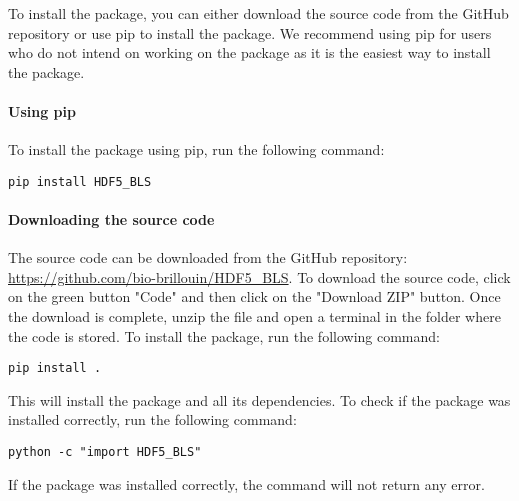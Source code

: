 To install the package, you can either download the source code from the GitHub repository or use pip to install the package. We recommend using pip for users who do not intend on working on the package as it is the easiest way to install the package.

\paragraph*{Using pip}
    To install the package using pip, run the following command:
\begin{lstlisting}
pip install HDF5_BLS
\end{lstlisting}   

\paragraph*{Downloading the source code}
The source code can be downloaded from the GitHub repository: \url{https://github.com/bio-brillouin/HDF5_BLS}. To download the source code, click on the green button "Code" and then click on the "Download ZIP" button. Once the download is complete, unzip the file and open a terminal in the folder where the code is stored. To install the package, run the following command:
\begin{lstlisting}
pip install .
\end{lstlisting}

This will install the package and all its dependencies. To check if the package was installed correctly, run the following command:
\begin{lstlisting}
python -c "import HDF5_BLS"
\end{lstlisting}

If the package was installed correctly, the command will not return any error.
